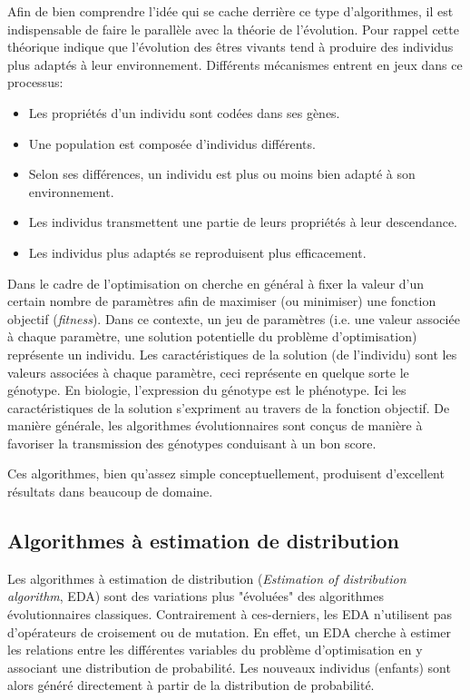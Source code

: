 \documentclass[a4paper, 11pt]{article}
\begin{document}
Afin de bien comprendre l'idée qui se cache derrière ce type d'algorithmes, il est indispensable de faire le parallèle avec la théorie de l'évolution. Pour rappel cette théorique indique que l'évolution des êtres vivants tend à produire des individus plus adaptés à leur environnement. %
Différents mécanismes entrent en jeux dans ce processus:
\begin{itemize}
\item Les propriétés d'un individu sont codées dans ses gènes.
\item Une population est composée d'individus différents.
\item Selon ses différences, un individu est plus ou moins bien adapté à son environnement.
\item Les individus transmettent une partie de leurs propriétés à leur descendance.
\item Les individus plus adaptés se reproduisent plus efficacement.
\end{itemize} %
Dans le cadre de l'optimisation on cherche en général à fixer la valeur d'un certain nombre de paramètres afin de maximiser (ou minimiser) une fonction objectif (\textit{fitness}). Dans ce contexte, un jeu de paramètres (i.e. une valeur associée à chaque paramètre, une solution potentielle du problème d'optimisation) représente un individu. Les caractéristiques de la solution (de l'individu) sont les valeurs associées à chaque paramètre, ceci représente en quelque sorte le génotype. En biologie, l'expression du génotype est le phénotype. Ici les caractéristiques de la solution s'expriment au travers de la fonction objectif. De manière générale, les algorithmes évolutionnaires sont conçus de manière à favoriser la transmission des génotypes conduisant à un bon score.  


Ces algorithmes, bien qu'assez simple conceptuellement, produisent d'excellent résultats dans beaucoup de domaine.

\subsection{Algorithmes à estimation de distribution}
Les algorithmes à estimation de distribution (\textit{Estimation of distribution algorithm}, EDA) sont des variations plus "évoluées" des algorithmes évolutionnaires classiques. Contrairement à ces-derniers, les EDA n'utilisent pas d'opérateurs de croisement ou de mutation. En effet, un EDA cherche à estimer les relations entre les différentes variables du problème d'optimisation en y associant une distribution de probabilité. Les nouveaux individus (enfants) sont alors généré directement à partir de la distribution de probabilité.
\end{document}
